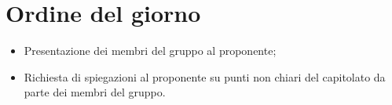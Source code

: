 \section{Ordine del giorno}
\begin{itemize}
\item Presentazione dei membri del gruppo al proponente;
\item Richiesta di spiegazioni al proponente su punti non chiari del capitolato da parte dei membri del gruppo.
\end{itemize}